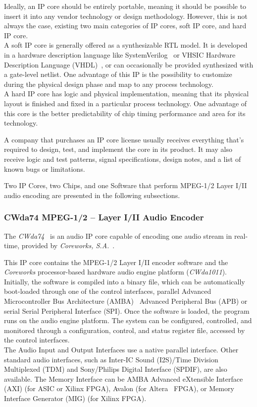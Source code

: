 Ideally, an IP core should be entirely portable, meaning it should be possible to insert it into any vendor technology or design methodology. However, this is not always the case, existing two main categories of IP cores, soft IP core, and hard IP core.\\
A soft IP core is generally offered as a synthesizable RTL model. It is developed in a hardware description language like SystemVerilog~\cite{ieee:systemVerilog} or VHSIC Hardware Description Language (VHDL)~\cite{ieee:vhdl}, or can occasionally be provided synthesized with a gate-level netlist. One advantage of this IP is the possibility to customize during the physical design phase and map to any process technology.\\
A hard IP core has logic and physical implementation, meaning that its physical layout is finished and fixed in a particular process technology.
One advantage of this core is the better predictability of chip timing performance and area for its technology. 

A company that purchases an IP core license usually receives everything that's required to design, test, and implement the core in its product. It may also receive logic and test patterns, signal specifications, design notes, and a list of known bugs or limitations.

Two IP Cores, two Chips, and one Software that perform MPEG-1/2 Layer I/II audio encoding are presented in the following subsections.

\subsubsection{CWda74 MPEG-1/2 – Layer I/II Audio Encoder}
 
The \textit{CWda74}~\cite{CWda74} is an audio IP core capable of encoding one audio stream in real-time, provided by \textit{Coreworks, S.A.}~\cite{coreworks}.

This IP core contains the MPEG-1/2 Layer I/II encoder software and the \textit{Coreworks} processor-based hardware audio engine platform (\textit{CWda1011}).\\
Initially, the software is compiled into a binary file, which can be automatically boot-loaded through one of the control interfaces, parallel Advanced Microcontroller Bus Architecture (AMBA)~\cite{bib:axi_amba} Advanced Peripheral Bus (APB) or serial Serial Peripheral Interface (SPI). 
Once the software is loaded, the program runs on the audio engine platform. The system can be configured, controlled, and monitored through a configuration, control, and status register file, accessed by the control interfaces. \\
The Audio Input and Output Interfaces use a native parallel interface. Other standard audio interfaces, such as Inter-IC Sound (I2S)/Time Division Multiplexed (TDM) and Sony/Philips Digital Interface (SPDIF), are also available.
The Memory Interface can be AMBA Advanced eXtensible Interface (AXI) (for ASIC or Xilinx FPGA), Avalon (for Altera~\cite{intel} FPGA), or Memory Interface Generator (MIG) (for Xilinx FPGA).

